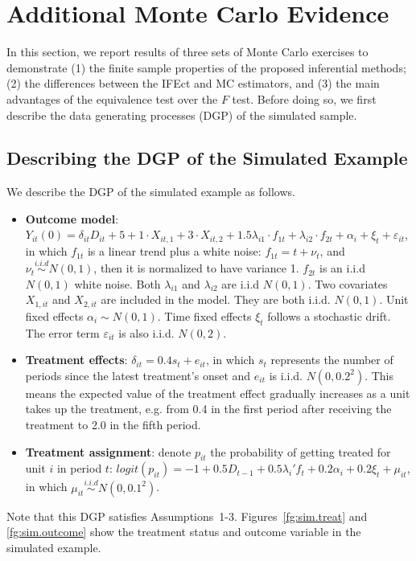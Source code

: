 \documentclass[12pt]{article}
\begin{document}
\section{Additional Monte Carlo Evidence}\label{sc:sim}

In this section, we report results of three sets of Monte Carlo exercises to demonstrate (1) the finite sample properties of the proposed inferential methods; (2) the differences between the IFEct and MC estimators, and (3) the main advantages of the equivalence test over the $F$ test. Before doing so, we first describe the data generating processes (DGP) of the simulated sample.


\subsection{Describing the DGP of the Simulated Example}

We describe the DGP of the simulated example as follows. 
\begin{itemize}
    \item {\bf Outcome model}: $Y_{it}(0) = \delta_{it} D_{it} + 5 + 1 \cdot X_{it,1} + 3 \cdot X_{it,2} + 1.5 \lambda_{i1}\cdot f_{1t} + \lambda_{i2}\cdot f_{2t}+ \alpha_{i} + \xi_{t} + \varepsilon_{it}$, in which $f_{1t}$ is a linear trend plus a white noise: $f_{1t} = t + \nu_{t}$, and $\nu_{t} \overset{i.i.d}{\sim} N(0,1)$, then it is normalized to have variance 1. $f_{2t}$ is an i.i.d $N(0,1)$ white noise. Both $\lambda_{i1}$ and $\lambda_{i2}$ are i.i.d $N(0,1)$. Two covariates $X_{1,it}$ and $X_{2,it}$ are included in the model. They are both i.i.d. $N(0,1)$. Unit fixed effects $\alpha_{i}\sim N(0,1)$. Time fixed effects $\xi_{t}$ follows a stochastic drift. The error term $\varepsilon_{it}$ is also i.i.d. $N(0,2)$.
    \item {\bf Treatment effects}: $\delta_{it}= 0.4 s_{t} + e_{it}$, in which $s_{t}$ represents the number of periods since the latest treatment's onset and $e_{it}$ is i.i.d. $N(0,0.2^2)$. This means the expected value of the treatment effect gradually increases as a unit takes up the treatment, e.g. from 0.4 in the first period after receiving the treatment to 2.0 in the fifth period. 
    \item {\bf Treatment assignment}: denote $p_{it}$ the probability of getting treated for unit $i$ in period $t$: $logit(p_{it}) = -1 + 0.5 D_{t-1} + 0.5\lambda_{i}'f_{t} + 0.2\alpha_{i} + 0.2\xi_{t} + \mu_{it}$, in which $\mu_{it} \overset{i.i.d}{\sim} N(0,0.1^2)$.
\end{itemize}
Note that this DGP satisfies Assumptions~1-3. Figures~\ref{fg:sim.treat} and \ref{fg:sim.outcome} show the treatment status and outcome variable in the simulated example. 
\end{document}
